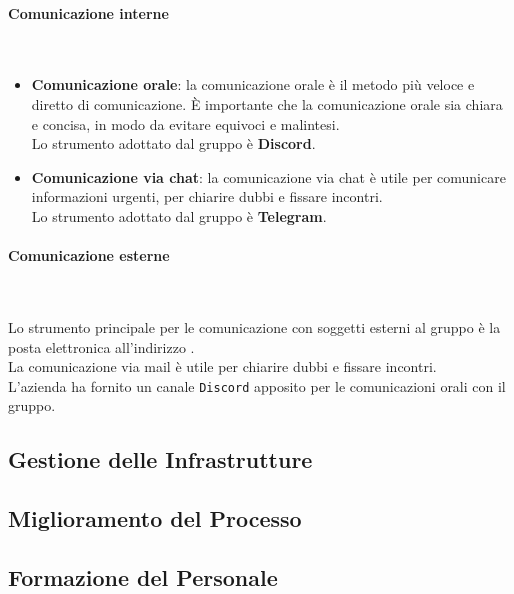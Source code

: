            \paragraph{Comunicazione interne} ~
            \begin{itemize}
                \item \textbf{Comunicazione orale}: la comunicazione orale è il metodo più veloce e diretto di comunicazione. È importante che la comunicazione orale sia chiara e concisa, in modo da evitare equivoci e malintesi. \\
                Lo strumento adottato dal gruppo è \textbf{Discord}.
                \item \textbf{Comunicazione via chat}: la comunicazione via chat è utile per comunicare informazioni urgenti, per chiarire dubbi e fissare incontri.  \\
                Lo strumento adottato dal gruppo è \textbf{Telegram}.
            \end{itemize}

            \paragraph{Comunicazione esterne} ~
            
            Lo strumento principale per le comunicazione con soggetti esterni al gruppo è la posta elettronica all'indirizzo \groupMail. \\
            La comunicazione via mail è utile per chiarire dubbi e fissare incontri.  \\
            L'azienda \companyName ha fornito un canale \texttt{Discord} apposito per le comunicazioni orali con il gruppo.
        

    \subsection{Gestione delle Infrastrutture}

    \subsection{Miglioramento del Processo}

    \subsection{Formazione del Personale}
